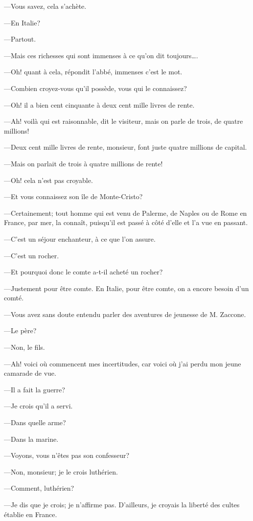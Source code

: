 —Vous savez, cela s'achète. 

—En Italie? 

—Partout. 

—Mais ces richesses qui sont immenses à ce qu'on dit toujours\dots. 

—Oh! quant à cela, répondit l'abbé, immenses c'est le mot. 

—Combien croyez-vous qu'il possède, vous qui le connaissez? 

—Oh! il a bien cent cinquante à deux cent mille livres de rente. 

—Ah! voilà qui est raisonnable, dit le visiteur, mais on parle de trois, de quatre millions! 

—Deux cent mille livres de rente, monsieur, font juste quatre millions de capital. 

—Mais on parlait de trois à quatre millions de rente! 

—Oh! cela n'est pas croyable. 

—Et vous connaissez son île de Monte-Cristo? 

—Certainement; tout homme qui est venu de Palerme, de Naples ou de Rome en France, par mer, la connaît, puisqu'il est passé à côté d'elle et l'a vue en passant. 

—C'est un séjour enchanteur, à ce que l'on assure. 

—C'est un rocher. 

—Et pourquoi donc le comte a-t-il acheté un rocher? 

—Justement pour être comte. En Italie, pour être comte, on a encore besoin d'un comté. 

—Vous avez sans doute entendu parler des aventures de jeunesse de M. Zaccone. 

—Le père? 

—Non, le fils. 

—Ah! voici où commencent mes incertitudes, car voici où j'ai perdu mon jeune camarade de vue. 

—Il a fait la guerre? 

—Je crois qu'il a servi. 

—Dans quelle arme? 

—Dans la marine. 

—Voyons, vous n'êtes pas son confesseur? 

—Non, monsieur; je le crois luthérien. 

—Comment, luthérien? 

—Je dis que je crois; je n'affirme pas. D'ailleurs, je croyais la liberté des cultes établie en France. 

